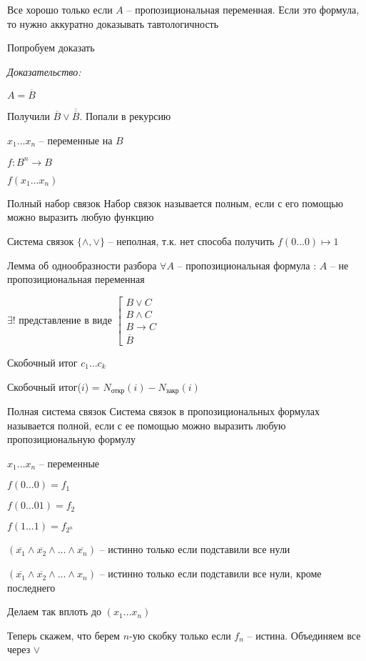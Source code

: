 \documentclass[12pt]{article}
\begin{document}
\begin{Remark}{}
    Все хорошо только если $A$ -- пропозициональная переменная. Если это формула, то нужно аккуратно доказывать тавтологичность

    Попробуем доказать
\end{Remark}

\textit{Доказательство:}

$A = \overline{B}$

Получили $\overline{B} \lor \overline{\overline{B}}$. Попали в рекурсию

\newpage

$x_1 \ldots x_n$ -- переменные на $B$

$f : B^n \to B$

$f(x_1 \ldots x_n)$

\begin{defin}{Полный набор связок}
    Набор связок называется полным, если с его помощью можно выразить любую функцию
\end{defin}

\begin{Example}{}
    Система связок $\{\land, \lor\}$ -- неполная, т.к. нет способа получить $f(0 \ldots 0) \mapsto 1$
\end{Example}

\begin{lem}{Лемма об однообразности разбора}
    $\forall A$ -- пропозициональная формула : $A$ -- не пропозициональная переменная 
    
    $\exists!$ представление в виде $\left[ \begin{gathered}
        B \lor C \\
        B \land C \\
        B \to C \\
        \overline{B}
    \end{gathered} \right.$
\end{lem}

\begin{defin}{Скобочный итог}
    $c_1 \ldots c_k$

    Скобочный итог($i$) = $N_\text{откр}(i) - N_\text{закр}(i)$
\end{defin}

\begin{defin}{Полная система связок}
    Система связок в пропозициональных формулах называется полной, если с ее помощью можно выразить любую пропозициональную формулу
\end{defin}

$x_1 \ldots x_n$ -- переменные

$f(0 \ldots 0) = f_1$

$f(0 \ldots 0 1) = f_2$

$f(1 \ldots 1) = f_{2^n}$

$(\overline{x_1} \land \overline{x_2} \land \ldots \land \overline{x_n})$ -- истинно только если подставили все нули

$(\overline{x_1} \land \overline{x_2} \land \ldots \land x_n)$ -- истинно только если подставили все нули, кроме последнего

Делаем так вплоть до $(x_1 \ldots x_n)$

Теперь скажем, что берем $n$-ую скобку только если $f_n$ -- истина. Объединяем все через $\lor$
\end{document}
